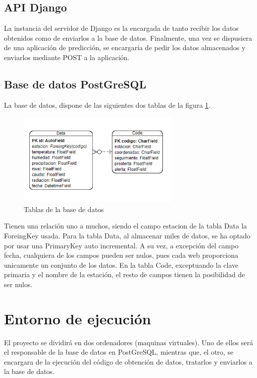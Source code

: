 \subsection{API Django}
La instancia del servidor de Django es la encargada de tanto recibir los datos obtenidos como de enviarlos a la base de datos. Finalmente, una vez se dispusiera de una aplicación de predicción, se encargaría de pedir los datos almacenados y enviarlos mediante POST a la aplicación.

\subsection{Base de datos PostGreSQL}
La base de datos, dispone de las siguientes dos tablas de la figura \ref{fig:ej33}.

\begin{figure} [H]
	\centering
	\includegraphics[width=0.7\textwidth]{fig/TablasBBDD.png}
	\caption[Tablas de la base de datos]{Tablas de la base de datos}
	\label{fig:ej33}
\end{figure}

Tienen una relación uno a muchos, siendo el campo estacion de la tabla Data la ForeingKey usada.\newline
\newline
Para la tabla Data, al almacenar miles de datos, se ha optado por usar una PrimaryKey auto incremental. A su vez, a excepción del campo fecha, cualquiera de los campos pueden ser nulos, pues cada web proporciona unicamente un conjunto de los datos.\newline
\newline
En la tabla Code, exceptuando la clave primaria y el nombre de la estación, el resto de campos tienen la posibilidad de ser nulos.

\section{Entorno de ejecución}
El proyecto se dividirá en dos ordenadores (maquinas virtuales). Uno de ellos será el responsable de la base de datos en PostGreSQL, mientras que, el otro, se encargara de la ejecución del código de obtención de datos, tratarlos y enviarlos a la base de datos.

